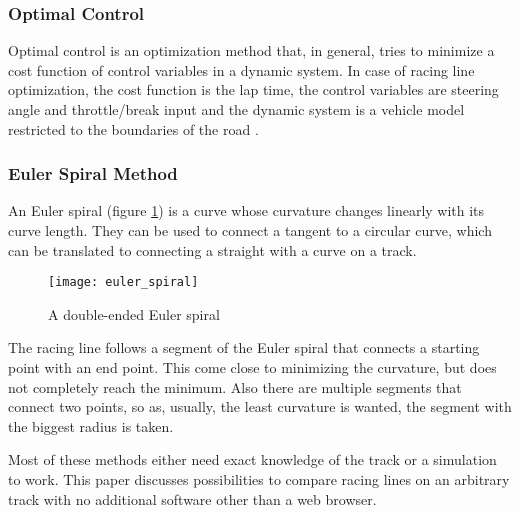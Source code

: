 \subsubsection{Optimal Control}
Optimal control is an optimization method that, in general, tries to minimize a cost function of control variables in a dynamic system. In case of racing line optimization, the cost function is the lap time, the control variables are steering angle and throttle/break input and the dynamic system is a vehicle model restricted to the boundaries of the road \cite{gustafsson08}.

\subsubsection{Euler Spiral Method}
An Euler spiral (figure \ref{fig:euler_spiral}) is a curve whose curvature changes linearly with its curve length. They can be used to connect a tangent to a circular curve, which can be translated to connecting a straight with a curve on a track.\\ \cite{xiong09}

\begin{figure}[!ht]
	\centering
	\texttt{[image: euler\_spiral]}
	\caption{A double-ended Euler spiral}
	\label{fig:euler_spiral}
\end{figure}

The racing line follows a segment of the Euler spiral that connects a starting point with an end point. This come close to minimizing the curvature, but does not completely reach the minimum. Also there are multiple segments that connect two points, so as, usually, the least curvature is wanted, the segment with the biggest radius is taken.

Most of these methods either need exact knowledge of the track or a simulation to work. This paper discusses possibilities to compare racing lines on an arbitrary track with no additional software other than a web browser.

\clearpage